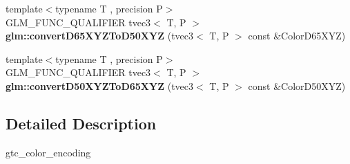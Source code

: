 \begin{DoxyCompactItemize}
{\footnotesize template$<$typename T , precision P$>$ }\\G\+L\+M\+\_\+\+F\+U\+N\+C\+\_\+\+Q\+U\+A\+L\+I\+F\+I\+ER tvec3$<$ T, P $>$ {\bfseries glm\+::convert\+D65\+X\+Y\+Z\+To\+D50\+X\+YZ} (tvec3$<$ T, P $>$ const \&Color\+D65\+X\+YZ)
\item 
\mbox{\label{color__encoding_8inl_abd0aba6ecc6ec9157139fccd985f188a}} 
{\footnotesize template$<$typename T , precision P$>$ }\\G\+L\+M\+\_\+\+F\+U\+N\+C\+\_\+\+Q\+U\+A\+L\+I\+F\+I\+ER tvec3$<$ T, P $>$ {\bfseries glm\+::convert\+D50\+X\+Y\+Z\+To\+D65\+X\+YZ} (tvec3$<$ T, P $>$ const \&Color\+D50\+X\+YZ)
\end{DoxyCompactItemize}


\subsection{Detailed Description}
gtc\+\_\+color\+\_\+encoding 